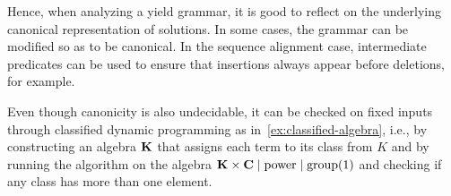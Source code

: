 Hence, when analyzing a yield grammar, it is good to reflect on the underlying canonical representation of solutions.
In some cases, the grammar can be modified so as to be canonical.
In the sequence alignment case, intermediate predicates can be used to ensure that insertions always appear before deletions, for example.

Even though canonicity is also undecidable, it can be checked on fixed inputs through classified dynamic programming as in~\cref{ex:classified-algebra}, i.e., by constructing an algebra \(\mathbf{K}\) that assigns each term to its class from \(K\) and by running the algorithm on the algebra \(\mathbf{K} \times \mathbf{C} \mid \mathrm{power} \mid \mathrm{group}(1)\) and checking if any class has more than one element.





%

%
%


%
%
%
%

